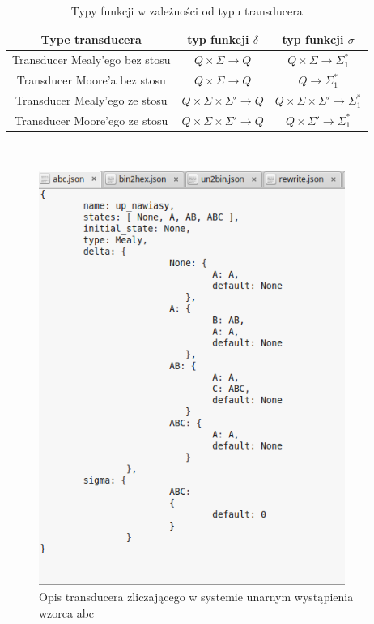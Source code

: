 \documentclass[declaration,shortabstract]{iithesis}
\theoremstyle{definition}
\theoremstyle{plain}
\begin{document}
\begin{table}[h]
    \centering
    \begin{tabular}{|c|c|c|}
        \hline
        Type transducera & typ funkcji \(\delta\) & typ funkcji \(\sigma\) \\ \hline
        Transducer Mealy'ego bez stosu & \(Q \times \Sigma \rightarrow Q\) & \(Q \times \Sigma \rightarrow \Sigma_1^*\)\\ \hline
        Transducer Moore'a bez stosu & \(Q \times \Sigma \rightarrow Q\) & \(Q \rightarrow \Sigma_1^*\)\\ \hline
        Transducer Mealy'ego ze stosu & \(Q \times \Sigma \times \Sigma' \rightarrow Q\) & \(Q \times \Sigma \times \Sigma' \rightarrow \Sigma_1^*\)\\ \hline
        Transducer Moore'ego ze stosu & \(Q \times \Sigma \times \Sigma' \rightarrow Q\) & \(Q \times \Sigma' \rightarrow \Sigma_1^*\)\\ \hline
    \end{tabular}
    \caption{Typy funkcji w zależności od typu transducera}
    \label{tab:types}
\end{table} \\
\begin{figure}[h]
    \centering
    \includegraphics[width=10cm]{wejscie.png}
    \caption{Opis transducera zliczającego w systemie unarnym wystąpienia wzorca abc}
    \label{fig:przykladowy_opis}
\end{figure}\\
\end{document}
